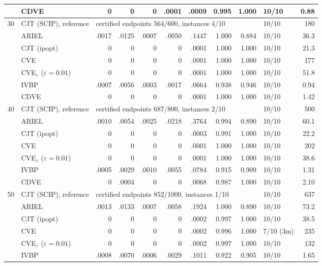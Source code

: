\begin{table}[htbp]
\begin{tabular}{rlrrrrrrrlr}
 & CDVE & 0 & 0 & 0 & .0001 & .0009 & 0.995 & 1.000 & 10/10 & 0.88 \\
\midrule
30 & CJT (SCIP), reference & \multicolumn{7}{l}{certified endpoints 564/600, instances 4/10} & 10/10 & 180 \\
 & ARIEL & .0017 & .0125 & .0007 & .0050 & .1447 & 1.000 & 0.884 & 10/10 & 36.3 \\
 & CJT (ipopt) & 0 & 0 & 0 & 0 & .0001 & 1.000 & 1.000 & 10/10 & 21.3 \\
 & CVE & 0 & 0 & 0 & 0 & .0001 & 1.000 & 1.000 & 10/10 & 177 \\
 & CVE$_\varepsilon$ ($\varepsilon{=}0.01$) & 0 & 0 & 0 & 0 & .0001 & 1.000 & 1.000 & 10/10 & 51.8 \\
 & IVBP & .0007 & .0056 & .0003 & .0017 & .0664 & 0.938 & 0.946 & 10/10 & 0.94 \\
 & CDVE & 0 & 0 & 0 & 0 & .0001 & 1.000 & 1.000 & 10/10 & 1.42 \\
\midrule
40 & CJT (SCIP), reference & \multicolumn{7}{l}{certified endpoints 687/800, instances 2/10} & 10/10 & 500 \\
 & ARIEL & .0010 & .0054 & .0025 & .0218 & .3764 & 0.994 & 0.890 & 10/10 & 60.1 \\
 & CJT (ipopt) & 0 & 0 & 0 & 0 & .0003 & 0.991 & 1.000 & 10/10 & 22.2 \\
 & CVE & 0 & 0 & 0 & 0 & .0001 & 1.000 & 1.000 & 10/10 & 202 \\
 & CVE$_\varepsilon$ ($\varepsilon{=}0.01$) & 0 & 0 & 0 & 0 & .0001 & 1.000 & 1.000 & 10/10 & 38.6 \\
 & IVBP & .0005 & .0029 & .0010 & .0055 & .0784 & 0.915 & 0.909 & 10/10 & 1.31 \\
 & CDVE & 0 & .0004 & 0 & 0 & .0068 & 0.987 & 1.000 & 10/10 & 2.10 \\
\midrule
50 & CJT (SCIP), reference & \multicolumn{7}{l}{certified endpoints 852/1000, instances 1/10} & 10/10 & 637 \\
 & ARIEL & .0013 & .0133 & .0007 & .0058 & .1924 & 1.000 & 0.890 & 10/10 & 73.2 \\
 & CJT (ipopt) & 0 & 0 & 0 & 0 & .0002 & 0.997 & 1.000 & 10/10 & 38.5 \\
 & CVE & 0 & 0 & 0 & 0 & .0002 & 0.996 & 1.000 & 7/10 (3m) & 235 \\
 & CVE$_\varepsilon$ ($\varepsilon{=}0.01$) & 0 & 0 & 0 & 0 & .0002 & 0.997 & 1.000 & 10/10 & 132 \\
 & IVBP & .0008 & .0070 & .0006 & .0029 & .1011 & 0.922 & 0.905 & 10/10 & 1.65 \\

\end{tabular}
\end{table}
